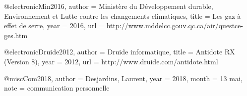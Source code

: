 
@electronic{Min2016,
author = {{Ministère du Développement durable, Environnement et Lutte contre les changements climatiques}},
title = {Les gaz à effet de serre},
year = {2016},
url = {http://www.mddelcc.gouv.qc.ca/air/questce-ges.htm}
}




@electronic{Druide2012,
author = {{Druide informatique}},
title = {Antidote {RX} (Version 8)},
year = {2012},
url = {http://www.druide.com/antidote.html}
} 



@misc{Com2018,
author = {Desjardins, Laurent},
year = {2018},
month = {13 mai},	
note = {communication personnelle}		
}

